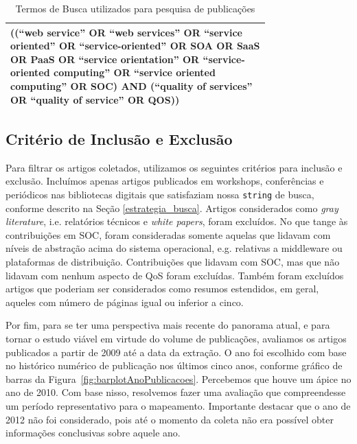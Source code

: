 \begin{table}[ht]
\centering
\caption{Termos de Busca utilizados para pesquisa de publicações}
\label{tab:exTable1}
\begin{tabular}{p{0.75\linewidth}}
\hline
((``web service'' OR ``web services'' OR ``service oriented'' OR ``service-oriented'' OR SOA OR SaaS OR PaaS OR ``service orientation'' OR ``service-oriented computing'' OR ``service oriented computing'' OR SOC) AND (``quality of services'' OR ``quality of service'' OR QOS)) \\
\hline
\end{tabular}
\end{table}


\subsection{Crit\'{e}rio de Inclusão e Exclusão}

Para filtrar os artigos coletados, utilizamos os seguintes critérios para inclus\~{a}o e exclus\~{a}o. Inclu\'{i}mos apenas artigos publicados em workshops, confer\^{e}ncias e peri\'{o}dicos nas bibliotecas digitais que satisfaziam nossa \texttt{string} de busca, conforme descrito na Se\c{c}\~{a}o \ref{estrategia_busca}. Artigos considerados como \emph{gray literature}, i.e. relat\'{o}rios t\'{e}cnicos e \emph{white papers}, foram exclu\'{i}dos. No que tange \`{a}s contribui\c{c}\~{o}es em SOC, foram consideradas somente aquelas que lidavam com n\'{i}veis de abstra\c{c}\~{a}o acima do sistema operacional, e.g. relativas a middleware ou plataformas de distribui\c{c}\~{a}o. Contribui\c{c}\~{o}es que lidavam com SOC, mas que n\~{a}o lidavam com nenhum aspecto de QoS foram exclu\'{i}das. Tamb\'{e}m foram exclu\'{i}dos artigos que poderiam ser considerados como resumos estendidos, em geral, aqueles com n\'{u}mero de p\'{a}ginas igual ou inferior a cinco. 

Por fim, para se ter uma perspectiva mais recente do panorama atual, e para tornar o estudo vi\'{a}vel em virtude do volume de publica\c{c}\~{o}es, avaliamos os artigos publicados a partir de 2009 at\'{e} a data da extra\c{c}\~{a}o. O ano foi escolhido com base no hist\'{o}rico num\'{e}rico de publica\c{c}\~{a}o nos \'{u}ltimos cinco anos, conforme gr\'{a}fico de barras da  Figura~\ref{fig:barplotAnoPublicacoes}. Percebemos que houve um \'{a}pice no ano de 2010. Com base nisso, resolvemos fazer uma avalia\c{c}\~{a}o que compreendesse um per\'{i}odo representativo para o mapeamento. Importante destacar que o ano de 2012 n\~{a}o foi considerado, pois at\'{e} o momento da coleta n\~{a}o era poss\'{i}vel obter informa\c{c}\~{o}es conclusivas sobre aquele ano.

